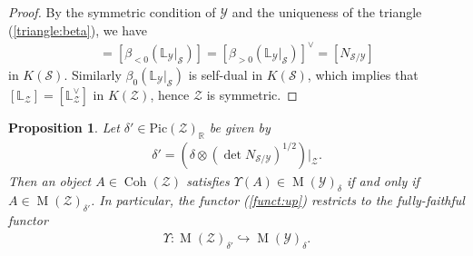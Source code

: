 \documentclass [11pt,oneside,a4paper,mathscr]{amsart}
\newtheorem{prop}[thm]{Proposition}
\theoremstyle{definition}
\newcommand{\Y}{\mathcal{Y}}
\newcommand{\zZ}{\mathcal{Z}}
\newcommand{\MM}{\operatorname{M}}
\newcommand{\Coh}{\operatorname{Coh}}
\begin{document}
\begin{proof}
    By the symmetric condition of $\mathcal{Y}$ 
    and the uniqueness of 
	the triangle (\ref{triangle:beta}), we have 
	\begin{align*}
		[\mathbb{L}_{\mathcal{S}/\mathcal{Z}}]=[\beta_{<0}(\mathbb{L}_{\mathcal{Y}}|_{\mathcal{S}})]=[\beta_{>0}(\mathbb{L}_{\mathcal{Y}}|_{\mathcal{S}})]^{\vee}=
		[N_{\mathcal{S}/\mathcal{Y}}]
		\end{align*}
	in $K(\mathcal{S})$. Similarly $\beta_0(\mathbb{L}_{\mathcal{Y}}|_{\mathcal{S}})$ is self-dual in $K(\mathcal{S})$, which implies that 
	$[\mathbb{L}_{\mathcal{Z}}]=[\mathbb{L}_{\mathcal{Z}}^{\vee}]$ in $K(\mathcal{Z})$, hence $\mathcal{Z}$ is symmetric. 
	\end{proof}



\begin{prop}\label{prop:functUp}
Let $\delta' \in \mathrm{Pic}(\zZ)_{\mathbb{R}}$ be given by 
\begin{align*}
		\delta'=\left(\delta \otimes (\det N_{\mathcal{S}/\mathcal{Y}})^{1/2}\right)|_{\mathcal{Z}}.
		\end{align*}
Then an object $A \in \Coh(\zZ)$ satisfies $\Upsilon(A) \in \MM(\Y)_{\delta}$ if and only if 
  $A \in \MM(\zZ)_{\delta'}$. 
  In particular, the functor (\ref{funct:up})
	restricts to the fully-faithful functor 
	\begin{align}\label{restrict:Up}
		\Upsilon \colon \MM(\mathcal{Z})_{\delta'} \hookrightarrow  \MM(\mathcal{Y})_{\delta}. 
		\end{align}
		\end{prop}
\end{document}
